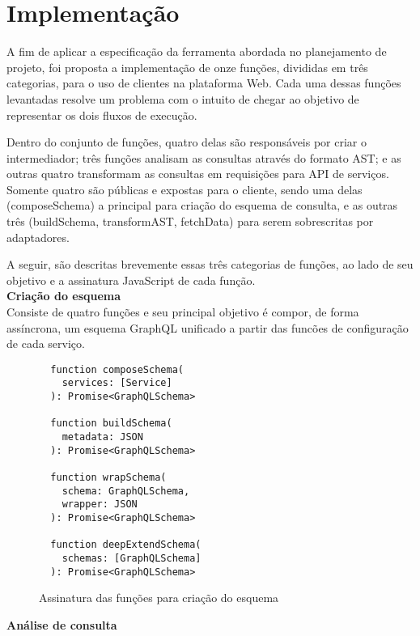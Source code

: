 \section{Implementação}

A fim de aplicar a especificação da ferramenta abordada no planejamento de projeto, foi proposta a implementação de onze funções, divididas em três categorias, para o uso de clientes na plataforma Web. Cada uma dessas funções levantadas resolve um problema com o intuito de chegar ao objetivo de representar os dois fluxos de execução.

Dentro do conjunto de funções, quatro delas são responsáveis por criar o intermediador; três funções analisam as consultas através do formato AST; e as outras quatro transformam as consultas em requisições para API de serviços. Somente quatro são públicas e expostas para o cliente, sendo uma delas (composeSchema) a principal para criação do esquema de consulta, e as outras três (buildSchema, transformAST, fetchData) para serem sobrescritas por adaptadores.

A seguir, são descritas brevemente essas três categorias de funções, ao lado de seu objetivo e a assinatura JavaScript de cada função. \\

\textbf{Criação do esquema} \\

Consiste de quatro funções e seu principal objetivo é compor, de forma assíncrona, um esquema GraphQL unificado a partir das funcões de configuração de cada serviço.

\begin{figure}[H]
  \centering
  \begin{verbatim}
  function composeSchema(
    services: [Service]
  ): Promise<GraphQLSchema>

  function buildSchema(
    metadata: JSON
  ): Promise<GraphQLSchema>

  function wrapSchema(
    schema: GraphQLSchema,
    wrapper: JSON
  ): Promise<GraphQLSchema>

  function deepExtendSchema(
    schemas: [GraphQLSchema]
  ): Promise<GraphQLSchema>
  \end{verbatim}
  \caption{Assinatura das funções para criação do esquema}
\end{figure}

\textbf{Análise de consulta} \\

